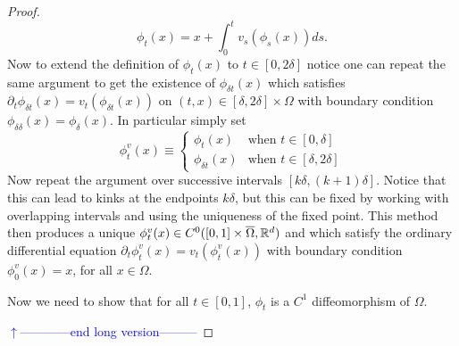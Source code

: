 \documentclass[noinfoline]{imsart}
\begin{document}
\begin{proof}
{\[ \phi_t(x) = x + \int_0^t v_s(\phi_s(x))ds. \]
Now to extend  the definition of $\phi_t(x)$ to $ t\in [0,2\delta]$ notice one can repeat the same argument to get the existence of $\phi_{\delta t}(x)$ which satisfies $\partial_t \phi_{\delta t}(x) = v_t(\phi_{\delta t}(x)) $ on $(t,x)\in [\delta,2\delta]\times\Omega$  with boundary condition $\phi_{\delta \delta}(x)=\phi_\delta(x)$.
In particular simply set 
\begin{equation}
\phi_t^v(x)\equiv \begin{cases}
\phi_t(x) & \text{when $t\in[0,\delta]$}\\
\phi_{\delta t}(x) & \text{when $t\in[\delta,2\delta]$}
\end{cases}
\end{equation}
Now repeat the argument over successive intervals $[k\delta, (k+1) \delta]$. Notice that this can lead to kinks at the endpoints $k\delta$, but this can be fixed by working with overlapping intervals and using the uniqueness of the fixed point.
This method then produces a unique   $\phi_t^v(x)\in C^0 ([0,1]\times \overline \Omega,\Bbb R^d)$ and  which satisfy the ordinary differential equation $
 \partial_t \phi_t^v(x) = v_t(\phi_t^v(x)) $ with boundary condition $\phi_0^v(x)=x$, for all $x\in \Omega$. 


Now we need to show that for all $t\in [0,1]$, $\phi_t$ is a $C^1$ diffeomorphism of $\Omega$. 

{\flushleft\textcolor{blue}{$\uparrow$------------end long version---------}}\newline
} \fi


\end{proof}
\end{document}
